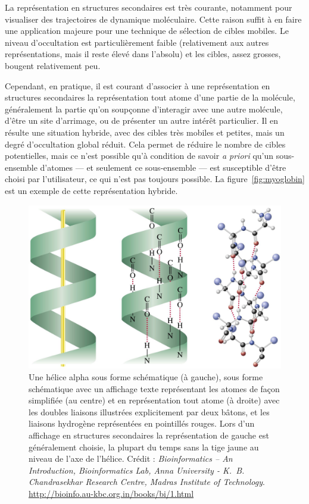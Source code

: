 	La représentation en structures secondaires est très courante, notamment pour visualiser des trajectoires de dynamique moléculaire. Cette raison suffit à en faire une application majeure pour une technique de sélection de cibles mobiles. Le niveau d'occultation est particulièrement faible (relativement aux autres représentations, mais il reste élevé dans l'absolu) et les cibles, assez grosses, bougent relativement peu.
		
	Cependant, en pratique, il est courant d'associer à une représentation en structures secondaires la représentation \og tout atome \fg{} d'une partie de la molécule, généralement la partie qu'on soupçonne d'interagir avec une autre molécule, d'être un site d'arrimage, ou de présenter un autre intérêt particulier. Il en résulte une situation hybride, avec des cibles très mobiles et petites, mais un degré d'occultation global réduit. Cela permet de réduire le nombre de cibles potentielles, mais ce n'est possible qu'à condition de savoir \emph{a priori} qu'un sous-ensemble d'atomes --- et seulement ce sous-ensemble --- est susceptible d'être choisi par l'utilisateur, ce qui n'est pas toujours possible. La figure~\ref{fig:myoglobin} est un exemple de cette représentation hybride.
		
	\begin{figure}[H]
		\centering
		\includegraphics[width=\textwidth]{figures/ch1/aHelix}
		\caption{Une hélice alpha sous forme schématique (à gauche), sous forme schématique avec un affichage texte représentant les atomes de façon simplifiée (au centre) et en représentation \og tout atome \fg{} (à droite) avec les doubles liaisons illustrées explicitement par deux bâtons, et les liaisons hydrogène représentées en pointillés rouges. Lors d'un affichage \og en structures secondaires \fg{} la représentation de gauche est généralement choisie, la plupart du temps sans la tige jaune au niveau de l'axe de l'hélice. Crédit : \emph{\emph{Bioinformatics -- An Introduction}, Bioinformatics Lab, Anna University - K.~B. Chandrasekhar Research Centre, Madras Institute of Technology}. \url{http://bioinfo.au-kbc.org.in/books/bi/1.html}}
		\label{fig:aHelix}
	\end{figure}
		
